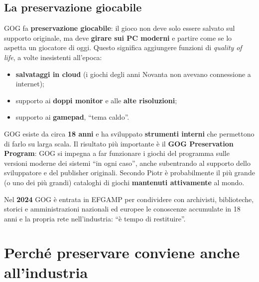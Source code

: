 \subsection{La preservazione giocabile}

GOG fa \textbf{preservazione giocabile}: il gioco non deve solo essere salvato
sul supporto originale, ma deve \textbf{girare sui PC moderni} e partire come se
lo aspetta un giocatore di oggi. Questo significa aggiungere funzioni di
\emph{quality of life}, a volte inesistenti all'epoca:
\begin{itemize}
  \item \textbf{salvataggi in cloud} (i giochi degli anni Novanta non avevano
        connessione a internet);
  \item supporto ai \textbf{doppi monitor} e alle \textbf{alte risoluzioni};
  \item supporto ai \textbf{gamepad}, ``tema caldo''.
\end{itemize}
GOG esiste da circa \textbf{18 anni} e ha sviluppato \textbf{strumenti interni}
che permettono di farlo su larga scala. Il risultato più importante è il
\textbf{GOG Preservation Program}: GOG si impegna a far funzionare i giochi del
programma sulle versioni moderne dei sistemi ``in ogni caso'', anche subentrando
al supporto dello sviluppatore e del publisher originali. Secondo Piotr è
probabilmente il più grande (o uno dei più grandi) cataloghi di giochi
\textbf{mantenuti attivamente} al mondo.

Nel \textbf{2024} GOG è entrata in EFGAMP per condividere con archivisti,
biblioteche, storici e amministrazioni nazionali ed europee le conoscenze
accumulate in 18 anni e la propria rete nell'industria: ``è tempo di
restituire''.

\section{Perché preservare conviene anche all'industria}
\label{sec:c1-4-business}

